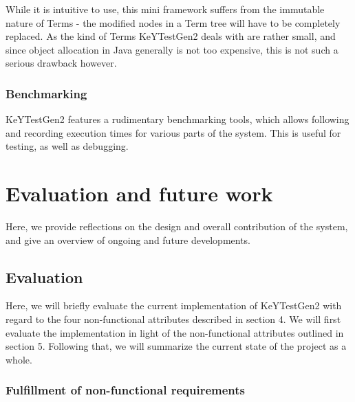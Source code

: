 \documentclass{article}
\begin{document}
While it is intuitive to use, this mini framework suffers from the immutable
nature of Terms - the modified nodes in a Term tree will have to be completely
replaced. As the kind of Terms KeYTestGen2 deals with are rather small, and
since object allocation in Java generally is not too expensive, this is not
such a serious drawback however.



\subsubsection{Benchmarking}

KeYTestGen2 features a rudimentary benchmarking tools, which allows following
and recording execution times for various parts of the system. This is useful
for testing, as well as debugging.

\section{Evaluation and future work}

Here, we provide reflections on the design and overall contribution of the
system, and give an overview of ongoing and future developments.

\subsection{Evaluation}

Here, we will briefly evaluate the current implementation of KeYTestGen2 with
regard to the four non-functional attributes described in section 4. We will
first evaluate the implementation in light of the non-functional attributes
outlined in section 5. Following that, we will summarize the current state of
the project as a whole.



\subsubsection{Fulfillment of non-functional requirements}
\end{document}
